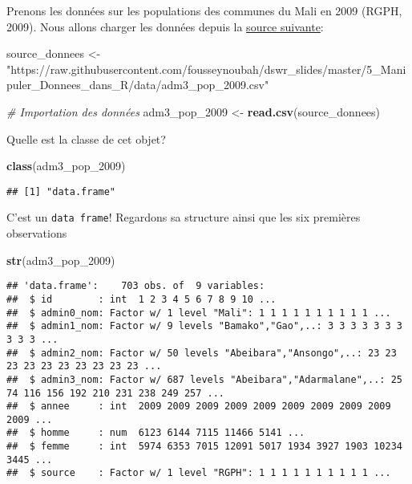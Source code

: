 \documentclass[]{book}
\newenvironment{Shaded}{\begin{snugshade}}{\end{snugshade}}
\newcommand{\KeywordTok}[1]{\textcolor[rgb]{0.13,0.29,0.53}{\textbf{#1}}}
\newcommand{\DecValTok}[1]{\textcolor[rgb]{0.00,0.00,0.81}{#1}}
\newcommand{\StringTok}[1]{\textcolor[rgb]{0.31,0.60,0.02}{#1}}
\newcommand{\CommentTok}[1]{\textcolor[rgb]{0.56,0.35,0.01}{\textit{#1}}}
\newcommand{\NormalTok}[1]{#1}
\begin{document}
Prenons les données sur les populations des communes du Mali en 2009
(RGPH, 2009). Nous allons charger les données depuis la
\href{https://raw.githubusercontent.com/fousseynoubah/dswr_slides/master/5_Manipuler_Donnees_dans_R/data/adm3_pop_2009.csv}{source
suivante}: \tiny

\begin{Shaded}
\begin{Highlighting}[]
\NormalTok{source_donnees <-}\StringTok{ "https://raw.githubusercontent.com/fousseynoubah/dswr_slides/master/5_Manipuler_Donnees_dans_R/data/adm3_pop_2009.csv"}
\end{Highlighting}
\end{Shaded}

\normalsize

\begin{Shaded}
\begin{Highlighting}[]
\CommentTok{# Importation des données}
\NormalTok{adm3_pop_}\DecValTok{2009}\NormalTok{ <-}\StringTok{ }\KeywordTok{read.csv}\NormalTok{(source_donnees)}
\end{Highlighting}
\end{Shaded}

Quelle est la classe de cet objet?

\begin{Shaded}
\begin{Highlighting}[]
\KeywordTok{class}\NormalTok{(adm3_pop_}\DecValTok{2009}\NormalTok{)}
\end{Highlighting}
\end{Shaded}

\begin{verbatim}
## [1] "data.frame"
\end{verbatim}

C'est un \texttt{data\ frame}! Regardons sa structure ainsi que les six
premières observations

\begin{Shaded}
\begin{Highlighting}[]
\KeywordTok{str}\NormalTok{(adm3_pop_}\DecValTok{2009}\NormalTok{)}
\end{Highlighting}
\end{Shaded}

\begin{verbatim}
## 'data.frame':    703 obs. of  9 variables:
##  $ id        : int  1 2 3 4 5 6 7 8 9 10 ...
##  $ admin0_nom: Factor w/ 1 level "Mali": 1 1 1 1 1 1 1 1 1 1 ...
##  $ admin1_nom: Factor w/ 9 levels "Bamako","Gao",..: 3 3 3 3 3 3 3 3 3 3 ...
##  $ admin2_nom: Factor w/ 50 levels "Abeibara","Ansongo",..: 23 23 23 23 23 23 23 23 23 23 ...
##  $ admin3_nom: Factor w/ 687 levels "Abeibara","Adarmalane",..: 25 74 116 156 192 210 231 238 249 257 ...
##  $ annee     : int  2009 2009 2009 2009 2009 2009 2009 2009 2009 2009 ...
##  $ homme     : num  6123 6144 7115 11466 5141 ...
##  $ femme     : int  5974 6353 7015 12091 5017 1934 3927 1903 10234 3445 ...
##  $ source    : Factor w/ 1 level "RGPH": 1 1 1 1 1 1 1 1 1 1 ...
\end{verbatim}
\end{document}
